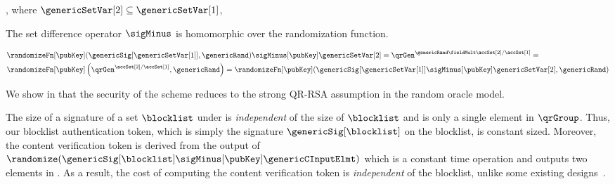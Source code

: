 , where $\genericSetVar[2] \subseteq \genericSetVar[1]$, 


\item {} The set difference operator $\sigMinus$ is homomorphic over the randomization function.    


\begin{align*} 
& \randomizeFn[\pubKey](\genericSig[\genericSetVar[1]], \genericRand) 
\sigMinus[\pubKey] \genericSetVar[2] = \qrGen^{\genericRand \fieldMult \accSet[2]/\accSet[1]}  = \\
&\randomizeFn[\pubKey]\left(\qrGen^{\accSet[2]/\accSet[1]}, \genericRand\right) = \randomizeFn[\pubKey](\genericSig[\genericSetVar[1]] \sigMinus[\pubKey] \genericSetVar[2], \genericRand)
\end{align*}

\itemListEnd


We show in  that the security of the scheme reduces to the 
strong QR-RSA assumption in the random oracle model. 



%


\begin{remark}
The size of a signature of a set $\blocklist$ under \ourSigScheme is \emph{independent} of the size of $\blocklist$ and is only a single element in $\qrGroup$. Thus, our blocklist authentication token, which is simply the signature $\genericSig[\blocklist]$ on the blocklist, is constant sized. Moreover, the content verification token is derived from the output of $\randomize(\genericSig[\blocklist] \sigMinus[\pubKey] \genericCInputElmt)$ which is a constant time operation and outputs two elements in \qrGroup. As a result, the cost of computing the content verification token is \emph{independent} of the blocklist, unlike some existing designs~\cite{kulshrestha2021identifying}. 
\end{remark}

